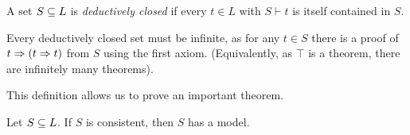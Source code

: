 \documentclass{article}
\begin{document}
\begin{definition}
    A set $S \subseteq L$ is \textit{deductively closed} if every $t \in L$ with $S \vdash t$ is itself contained in $S$.
\end{definition}

\begin{note}
	Every deductively closed set must be infinite, as for any $t \in S$ there is a proof of $t \Rightarrow (t \Rightarrow t)$ from $S$ using the first axiom. (Equivalently, as $\top$ is a theorem, there are infinitely many theorems).
\end{note}

This definition allows us to prove an important theorem.

\begin{theorem}
	\label{model-existence-lemma}
    Let $S \subseteq L$. If $S$ is consistent, then $S$ has a model.
\end{theorem}
\end{document}
